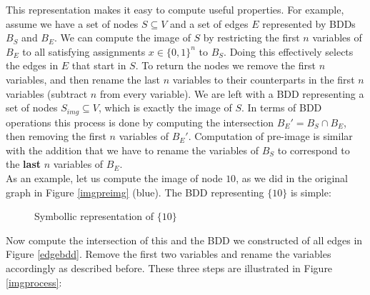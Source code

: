 \documentclass[../master/master.tex]{subfiles}
\begin{document}
This representation makes it easy to compute useful properties. For example, assume we have a set of nodes $S\subseteq V$ and a set of edges $E$ represented by BDDs $B_S$ and $B_E$. We can compute the image of $S$ by restricting the first $n$ variables of $B_E$ to all satisfying assignments $x\in\{0,1\}^{n}$ to $B_S$. Doing this effectively selects the edges in $E$ that start in $S$. To return the nodes we remove the first $n$ variables, and then rename the last $n$ variables to their counterparts in the first $n$ variables (subtract $n$ from every variable). We are left with a BDD representing a set of nodes $S_{img}\subseteq V$, which is exactly the image of $S$. In terms of BDD operations this process is done by computing the intersection $B_{E}' = B_S\cap B_E$, then removing the first $n$ variables of $B_E'$. Computation of pre-image is similar with the addition that we have to rename the variables of $B_S$ to correspond to the \textbf{last} $n$ variables of $B_E$.\\
As an example, let us compute the image of node $10$, as we did in the original graph in Figure \ref{imgpreimg} (blue). The BDD representing $\{10\}$ is simple:

\begin{figure}[H]
\center
{}
\caption{Symbollic representation of $\{10\}$}
\end{figure}
Now compute the intersection of this and the BDD we constructed of all edges in Figure \ref{edgebdd}. Remove the first two variables and rename the variables accordingly as described before. These three steps are illustrated in Figure  \ref{imgprocess}:
\end{document}
